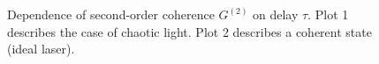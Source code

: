 \begin{figure}
\centering



\caption{Dependence of second-order coherence $G^{(2)}$ on
  delay $\tau$. Plot 1 describes the case of chaotic
  light. Plot 2 describes a coherent state (ideal laser).}
\label{figPart4Ch2_4a}
\end{figure}